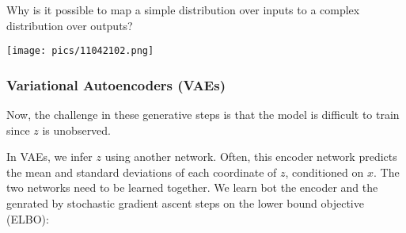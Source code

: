 \documentclass[11pt]{scrartcl}
\begin{document}
Why is it possible to map a simple distribution over inputs to a complex distribution over outputs?
\begin{center}
    \texttt{[image: pics/11042102.png]}
\end{center}

\subsubsection{Variational Autoencoders (VAEs)}
Now, the challenge in these generative steps is that the model is difficult to train since $z$ is unobserved. 

In VAEs, we infer $z$ using another network. Often, this encoder network predicts the mean and standard deviations of each coordinate of $z$, conditioned on $x$. The two networks need to be learned together. We learn bot the encoder and the genrated by stochastic gradient ascent steps on the lower bound objective (ELBO): 
\end{document}
